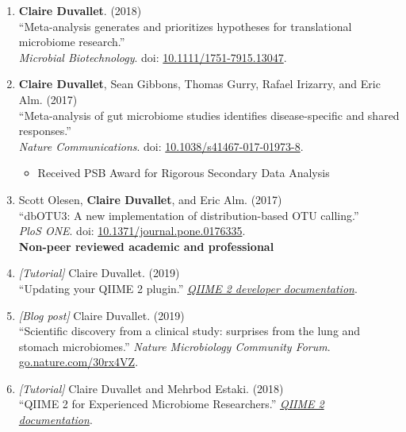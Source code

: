\documentclass[10pt]{article}
\makeatletter
\newlength{\bibhang}
\newlength{\bibsep}
 {\@listi \global\bibsep\itemsep \global\advance\bibsep by\parsep}
\newenvironment{bibsection}%
        {\begin{enumerate}{}{%
       \setlength{\leftmargin}{\bibhang}%
       \setlength{\itemindent}{-\leftmargin}%
       \setlength{\itemsep}{\bibsep}%
       \setlength{\parsep}{\z@}%
        \setlength{\partopsep}{0pt}%
        \setlength{\topsep}{0pt}}}
        {\end{enumerate}\vspace{-.6\baselineskip}}
\makeatother
\begin{document}
\begin{bibsection}
	\item \textbf{Claire Duvallet}. (2018) \\ 
		``Meta-analysis generates and prioritizes hypotheses for translational microbiome research.'' \\ 
		\emph{Microbial Biotechnology}. doi: \href{https://doi.org/10.1111/1751-7915.13047}{10.1111/1751-7915.13047}.
		
	\item \textbf{Claire Duvallet}, Sean Gibbons, Thomas Gurry, Rafael  Irizarry, and Eric Alm. (2017) \\ 
		``Meta-analysis of gut microbiome studies identifies disease-specific and shared responses.'' \\ 
		\emph{Nature Communications}. doi: \href{https://doi.org/10.1038/s41467-017-01973-8}{10.1038/s41467-017-01973-8}.
		
		\begin{itemize}
			\item Received PSB Award for Rigorous Secondary Data Analysis 
		\end{itemize}		
				
	\item Scott Olesen, \textbf{Claire Duvallet}, and Eric Alm. (2017) \\ 
		``dbOTU3: A new implementation of distribution-based OTU calling.'' \\ 
		\emph{PloS ONE}. doi: \href{https://doi.org/10.1371/journal.pone.0176335}{10.1371/journal.pone.0176335}. \\

\textbf{Non-peer reviewed academic and professional}

	\item \textit{[Tutorial]} Claire Duvallet. (2019) \\ 
		``Updating your QIIME 2 plugin.'' \href{https://dev.qiime2.org/latest/tutorials/updating-plugin/}{\emph{QIIME 2 developer documentation}}.

	\item \textit{[Blog post]} Claire Duvallet. (2019) \\ 
		``Scientific discovery from a clinical study: surprises from the lung and stomach microbiomes.'' 
		\emph{Nature Microbiology Community Forum}. \href{https://go.nature.com/30rx4VZ}{go.nature.com/30rx4VZ}.

	\item \textit{[Tutorial]} Claire Duvallet and Mehrbod Estaki. (2018) \\ 
		``QIIME 2 for Experienced Microbiome Researchers.'' \href{https://docs.qiime2.org/latest/tutorials/qiime2-for-experienced-microbiome-researchers/}{\emph{QIIME 2 documentation}}.


\end{bibsection}
\end{document}
